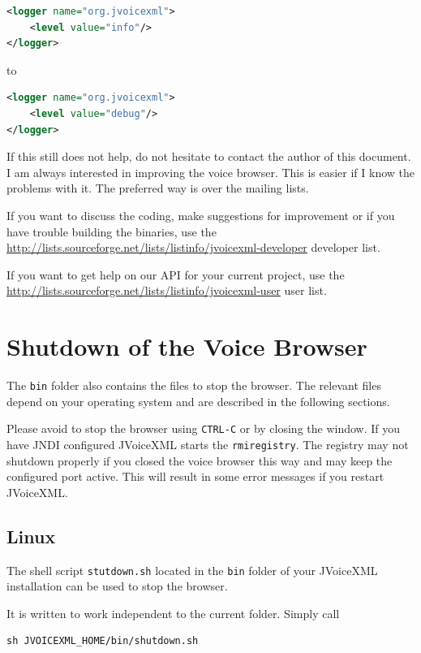 \documentclass[11pt,a4paper]{book}
\begin{document}
\begin{lstlisting}[language=XML]
<logger name="org.jvoicexml">
    <level value="info"/>
</logger>
\end{lstlisting}

to

\begin{lstlisting}[language=XML]
<logger name="org.jvoicexml">
    <level value="debug"/>
</logger>
\end{lstlisting}

If this still does not help, do not hesitate to contact the author of this
document. I am always interested in improving the voice browser. This is
easier if I know the problems with it. The preferred way is over the mailing
lists.

If you want to discuss the coding, make suggestions for improvement or if
you have trouble building the binaries, use the
\url{http://lists.sourceforge.net/lists/listinfo/jvoicexml-developer}
developer list.

If you want to get help on our API for your current project, use the
\url{http://lists.sourceforge.net/lists/listinfo/jvoicexml-user} user list.

\section{Shutdown of the Voice Browser}

The \texttt{bin} folder also contains the files to stop the browser. The
relevant files depend on your operating system and are described in the following
sections.

Please avoid to stop the browser using \lstinline{CTRL-C} or by closing the
window. If you have JNDI configured JVoiceXML starts the \lstinline{rmiregistry}.
The registry may not shutdown properly if you closed the voice browser this way
and may keep the configured port active. This will result in some error messages
if you restart JVoiceXML.


\subsection{Linux}

The shell script \texttt{stutdown.sh} located in the \texttt{bin} folder
of your JVoiceXML installation can be used to stop the browser.

It is written to work independent to the current folder. Simply call

\begin{lstlisting}
sh JVOICEXML_HOME/bin/shutdown.sh
\end{lstlisting}
\end{document}
